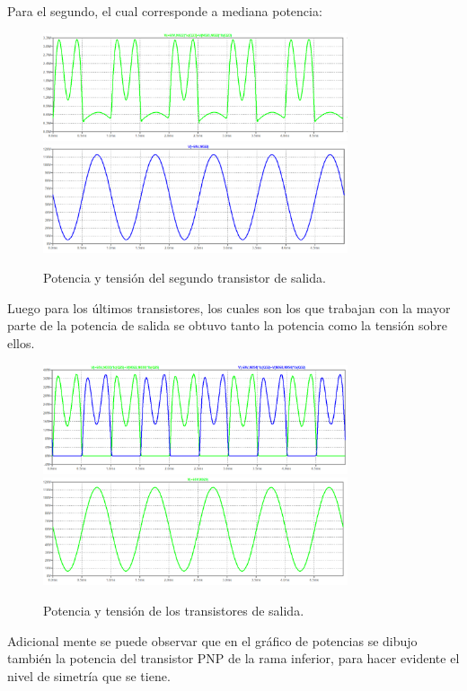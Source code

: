 Para el segundo, el cual corresponde a mediana potencia:
\begin{figure}[H]
	\centering
	\includegraphics[width=0.8\textwidth]{ImagenesSimulaciones/PO2.png}
		\includegraphics[width=0.8\textwidth]{ImagenesSimulaciones/VO2.png}
	\caption{Potencia y tensión del segundo transistor de salida.}
	\label{fig:po2}
\end{figure}
Luego para los últimos transistores, los cuales son los que trabajan con la mayor parte de la potencia de salida se obtuvo tanto la potencia como la tensión sobre ellos.
\begin{figure}[H]
	\centering
	\includegraphics[width=0.8\textwidth]{ImagenesSimulaciones/PO3.png}
		\includegraphics[width=0.8\textwidth]{ImagenesSimulaciones/VO3.png}
	\caption{Potencia y tensión de los transistores de salida.}
	\label{fig:po3}
\end{figure}
Adicional mente se puede observar que en el gráfico de potencias se dibujo también la potencia del transistor PNP de la rama inferior, para hacer evidente el nivel de simetría que se tiene.

